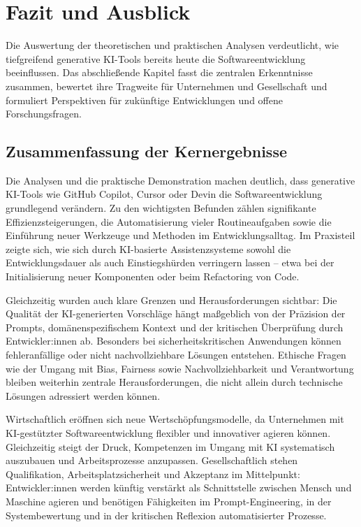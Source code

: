 \chapter{Fazit und Ausblick}
Die Auswertung der theoretischen und praktischen Analysen verdeutlicht, wie
tiefgreifend generative KI-Tools bereits heute die Softwareentwicklung
beeinflussen. Das abschließende Kapitel fasst die zentralen Erkenntnisse
zusammen, bewertet ihre Tragweite für Unternehmen und Gesellschaft und
formuliert Perspektiven für zukünftige Entwicklungen und offene
Forschungsfragen.

\section{Zusammenfassung der Kernergebnisse}
Die Analysen und die praktische Demonstration machen deutlich, dass generative
KI-Tools wie GitHub Copilot, Cursor oder Devin die Softwareentwicklung
grundlegend verändern. Zu den wichtigsten Befunden zählen signifikante
Effizienzsteigerungen, die Automatisierung vieler Routineaufgaben sowie die
Einführung neuer Werkzeuge und Methoden im Entwicklungsalltag. Im Praxisteil
zeigte sich, wie sich durch KI-basierte Assistenzsysteme sowohl die
Entwicklungsdauer als auch Einstiegshürden verringern lassen – etwa bei der
Initialisierung neuer Komponenten oder beim Refactoring von Code.

Gleichzeitig wurden auch klare Grenzen und Herausforderungen sichtbar: Die
Qualität der KI-generierten Vorschläge hängt maßgeblich von der Präzision der
Prompts, domänenspezifischem Kontext und der kritischen Überprüfung durch
Entwickler:innen ab. Besonders bei sicherheitskritischen Anwendungen können
fehleranfällige oder nicht nachvollziehbare Lösungen entstehen. Ethische Fragen
wie der Umgang mit Bias, Fairness sowie Nachvollziehbarkeit und Verantwortung
bleiben weiterhin zentrale Herausforderungen, die nicht allein durch technische
Lösungen adressiert werden können.

Wirtschaftlich eröffnen sich neue Wertschöpfungsmodelle, da Unternehmen mit
KI-gestützter Softwareentwicklung flexibler und innovativer agieren können.
Gleichzeitig steigt der Druck, Kompetenzen im Umgang mit KI systematisch
auszubauen und Arbeitsprozesse anzupassen. Gesellschaftlich stehen
Qualifikation, Arbeitsplatzsicherheit und Akzeptanz im Mittelpunkt:
Entwickler:innen werden künftig verstärkt als Schnittstelle zwischen Mensch und
Maschine agieren und benötigen Fähigkeiten im Prompt-Engineering, in der
Systembewertung und in der kritischen Reflexion automatisierter Prozesse.

